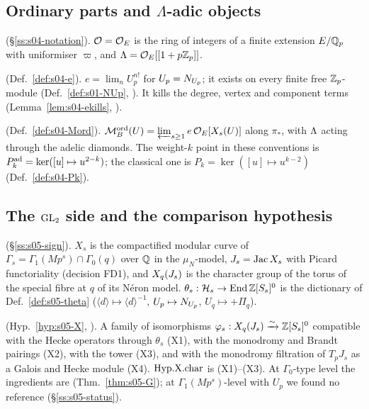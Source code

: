 \subsection{Ordinary parts and \texorpdfstring{$\Lambda$}{Lambda}-adic objects}\label{ss:s00-ord}
\begin{description}[leftmargin=0pt,itemsep=3pt]
\item[Coefficients] (\S\ref{ss:s04-notation}). $\mathcal{O}=\mathcal{O}_E$ is the ring of integers of a finite extension $E/\mathbb{Q}_p$ with uniformiser
  $\varpi$, and $\Lambda=\mathcal{O}_E[[1+p\mathbb{Z}_p]]$.
\item[Ordinary projector] (Def.~\ref{def:s04-e}). $e=\lim_nU_p^{n!}$ for $U_p=N_{U_p}$; it exists on every finite free $\mathbb{Z}_p$-module
  (Def.~\ref{def:s01-NUp}, \stproved). It kills the degree, vertex and component terms (Lemma~\ref{lem:s04-ekills}, \stproved).
\item[$\Lambda$-adic Brandt module] (Def.~\ref{def:s04-Mord}). $\mathcal{M}^{\mathrm{ord}}_B(U)=\varprojlim_{s\ge1}e\,\mathcal{O}_E[X_s(U)]$ along $\pi_*$, with $\Lambda$ acting
  through the adelic diamonds. The weight-$k$ point in these conventions is $P^{\rm ad}_k=\ker([u]\mapsto u^{2-k})$; the classical
  one is $P_k=\ker([u]\mapsto u^{k-2})$ (Def.~\ref{def:s04-Pk}).
\end{description}

\subsection{The \texorpdfstring{$\mathrm{GL}_2$}{GL2} side and the comparison hypothesis}\label{ss:s00-gl2}
\begin{description}[leftmargin=0pt,itemsep=3pt]
\item[Curves and character groups] (\S\ref{ss:s05-sign}). $X_s$ is the compactified modular curve of $\Gamma_s=\Gamma_1(Mp^s)\cap\Gamma_0(q)$
  over $\mathbb{Q}$ in the $\mu_N$-model, $J_s=\operatorname{Jac} X_s$ with Picard functoriality (decision FD1), and $X_q(J_s)$ is the character group of the
  torus of the special fibre at $q$ of its N\'eron model. $\theta_s:\mathcal{H}_s\to\operatorname{End}\mathbb{Z}[S_s]^0$ is the dictionary of Def.~\ref{def:s05-theta}
  ($\langle d\rangle\mapsto\langle d\rangle^{-1}$, $U_p\mapsto N_{U_p}$, $U_q\mapsto+\Pi_q$).
\item[$\HypX$] (Hyp.~\ref{hyp:s05-X}, \sthyp). A family of isomorphisms $\varphi_s:X_q(J_s)\xrightarrow\sim\mathbb{Z}[S_s]^0$ compatible with the
  Hecke operators through $\theta_s$ (X1), with the monodromy and Brandt pairings (X2), with the tower (X3), and with the
  monodromy filtration of $T_pJ_s$ as a Galois and Hecke module (X4). $\mathrm{Hyp.X.char}$ is (X1)--(X3). At $\Gamma_0$-type level the
  ingredients are \stcited{} (Thm.~\ref{thm:s05-G}); at $\Gamma_1(Mp^s)$-level with $U_p$ we found no reference (\S\ref{ss:s05-status}).
\end{description}

